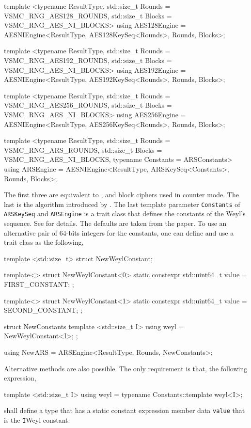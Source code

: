 \begin{cppcode}
  template <typename ResultType, std::size_t Rounds = VSMC_RNG_AES128_ROUNDS,
      std::size_t Blocks = VSMC_RNG_AES_NI_BLOCKS>
  using AES128Engine =
      AESNIEngine<ResultType, AES128KeySeq<Rounds>, Rounds, Blocks>;
  
  template <typename ResultType, std::size_t Rounds = VSMC_RNG_AES192_ROUNDS,
      std::size_t Blocks = VSMC_RNG_AES_NI_BLOCKS>
  using AES192Engine =
      AESNIEngine<ResultType, AES192KeySeq<Rounds>, Rounds, Blocks>;
  
  template <typename ResultType, std::size_t Rounds = VSMC_RNG_AES256_ROUNDS,
      std::size_t Blocks = VSMC_RNG_AES_NI_BLOCKS>
  using AES256Engine =
      AESNIEngine<ResultType, AES256KeySeq<Rounds>, Rounds, Blocks>;
  
  template <typename ResultType, std::size_t Rounds = VSMC_RNG_ARS_ROUNDS,
      std::size_t Blocks = VSMC_RNG_AES_NI_BLOCKS,
      typename Constants = ARSConstants>
  using ARSEngine =
      AESNIEngine<ResultType, ARSKeySeq<Constants>, Rounds, Blocks>;
\end{cppcode}
The first three are equivalent to ,  and  block ciphers
used in counter mode. The last is the \ars algorithm introduced by
\textcite{Salmon:2011um}. The last template parameter \verb|Constants| of
\verb|ARSKeySeq| and \verb|ARSEngine| is a trait class that defines the
constants of the Weyl's sequence. See \textcite{Salmon:2011um} for details. The
defaults are taken from the paper. To use an alternative pair of 64-bits
integers for the constants, one can define and use a trait class as the
following,
\begin{cppcode}
  template <std::size_t>
  struct NewWeylConstant;

  template<>
  struct NewWeylConstant<0>
  {
      static constexpr std::uint64_t value = FIRST_CONSTANT;
  };

  template<>
  struct NewWeylConstant<1>
  {
      static constexpr std::uint64_t value = SECOND_CONSTANT;
  };

  struct NewConstants
  {
      template <std::size_t I>
      using weyl = NewWeylConstant<I>;
  };

  using NewARS = ARSEngine<ResultType, Rounds, NewConstants>;
\end{cppcode}
Alternative methods are also possible. The only requirement is that, the
following expression,
\begin{cppcode}
  template <std::size_t I>
  using weyl = typename Constants::template weyl<I>;
\end{cppcode}
shall define a type that has a static constant expression member data
\verb|value| that is the \verb|I|\ith Weyl constant.

